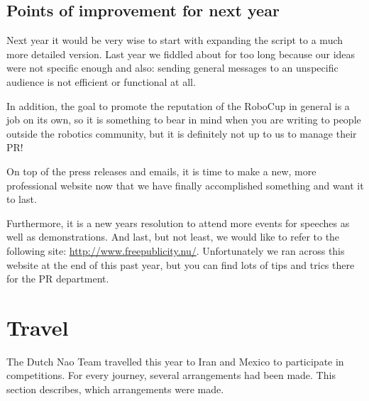 \documentclass[11pt,a4paper,oneside]{article}
\begin{document}
\subsection{Points of improvement for next year}
Next year it would be very wise to start with expanding the script to a much more detailed version. Last year we fiddled about for too long because our ideas were not specific enough and also: sending general messages to an unspecific audience is not efficient or functional at all. 

In addition, the goal to promote the reputation of the RoboCup in general is a job on its own, so it is something to bear in mind when you are writing to people outside the robotics community, but it is definitely not up to us to manage their PR!

On top of the press releases and emails, it is time to make a new, more professional website now that we have finally accomplished something and want it to last.

Furthermore, it is a new years resolution to attend more events for speeches as well as demonstrations.
And last, but not least, we would like to refer to the following site: \url{http://www.freepublicity.nu/}. Unfortunately we ran across this website at the end of this past year, but you can find lots of tips and trics there for the PR department.

\section{Travel}
The Dutch Nao Team travelled this year to Iran and Mexico to participate in competitions. For every journey, several arrangements had been made. This section describes, which arrangements were made.

\end{document}
